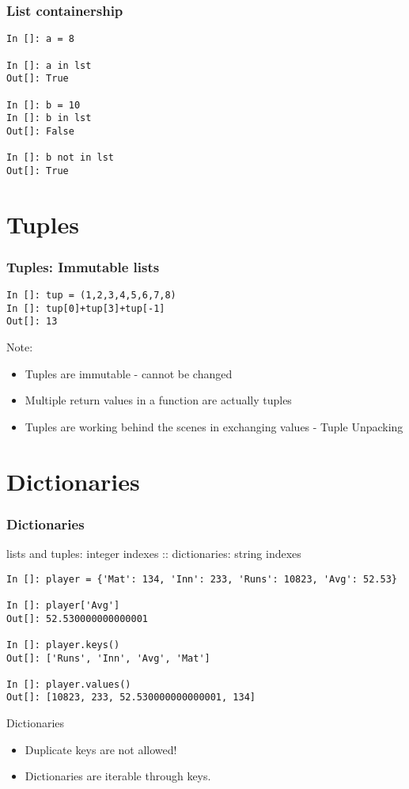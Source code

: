 \documentclass[14pt,compress]{beamer}
\newcounter{time}
\newcommand{\inctime}[1]{\addtocounter{time}{#1}{\tiny \thetime\ m}}
\begin{document}
\begin{frame}[fragile]
\frametitle{List containership}
\begin{lstlisting}
In []: a = 8

In []: a in lst
Out[]: True

In []: b = 10
In []: b in lst
Out[]: False

In []: b not in lst
Out[]: True
\end{lstlisting}
\inctime{10}
\end{frame}

\section{Tuples}
\begin{frame}[fragile]
\frametitle{Tuples: Immutable lists}
\begin{lstlisting}
In []: tup = (1,2,3,4,5,6,7,8)
In []: tup[0]+tup[3]+tup[-1]
Out[]: 13
\end{lstlisting}
\begin{block}{Note:}
\begin{itemize}
\item Tuples are immutable - cannot be changed
\item Multiple return values in a function are actually tuples
\item Tuples are working behind the scenes in exchanging values - Tuple Unpacking
\end{itemize}
\end{block}
\inctime{5}
\end{frame}

\section{Dictionaries}
\begin{frame}[fragile]
\frametitle{Dictionaries}
  \alert {lists and tuples: integer indexes :: dictionaries: string indexes}
\begin{lstlisting}
In []: player = {'Mat': 134, 'Inn': 233, 'Runs': 10823, 'Avg': 52.53}

In []: player['Avg']
Out[]: 52.530000000000001

In []: player.keys()
Out[]: ['Runs', 'Inn', 'Avg', 'Mat']

In []: player.values()
Out[]: [10823, 233, 52.530000000000001, 134]
\end{lstlisting}
\end{frame}

\begin{frame}{Dictionaries}
\begin{itemize}
\item Duplicate keys are not allowed!
\item Dictionaries are iterable through keys.
\end{itemize}
\inctime{5}
\end{frame}
\end{document}

